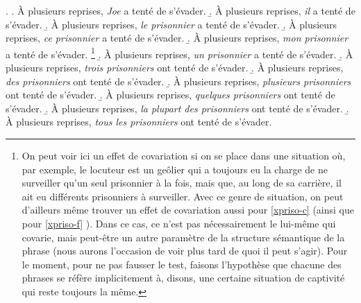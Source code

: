 \ex. \label{xGNsubitcv}
\a. À plusieurs reprises, \emph{Joe} a tenté de s'évader. 
\b. À plusieurs reprises, \emph{il} a tenté de s'évader.\label{xpriso-b}  
\b. À plusieurs reprises, \emph{le prisonnier} a tenté de s'évader.\label{xpriso-c} 
\b. À plusieurs reprises, \emph{ce prisonnier} a tenté de s'évader. 
\b. À plusieurs reprises, \emph{mon prisonnier} a tenté de s'évader.%
\footnote{\label{fnmonpriso}On peut voir ici un effet de covariation si on se place dans une situation où, par exemple, le locuteur est un geôlier qui a toujours eu la charge de ne surveiller qu'un seul prisonnier à la fois, mais que, au long de sa carrière, il ait eu différents prisonniers à surveiller. Avec ce genre de situation, on peut d'ailleurs même trouver un effet de covariation aussi pour \ref{xpriso-c} (ainsi que pour \ref{xpriso-f} ). Dans ce cas, ce n'est pas nécessairement le {\GN} lui-même qui covarie, mais peut-être un autre paramètre de la structure sémantique de la phrase (nous aurons l'occasion de voir plus tard de quoi il peut s'agir). %
Pour le moment, pour ne pas fausser le test, faisons l'hypothèse que chacune des phrases se réfère implicitement à, disons, une certaine situation de captivité qui reste toujours la même.} 
\b. \jcovar À plusieurs reprises, \emph{un prisonnier} a tenté de s'évader. 
\b. \jcovar À plusieurs reprises, \emph{trois prisonniers} ont tenté de s'évader. 
\b. \jcovar À plusieurs reprises, \emph{des prisonniers} ont tenté de s'évader. 
\b. \jcovar À plusieurs reprises, \emph{plusieurs prisonniers} ont tenté de s'évader. 
\b. \jcovar À plusieurs reprises, \emph{quelques prisonniers} ont tenté de s'évader. 
\b. \jcovar À plusieurs reprises, \emph{la plupart des prisonniers} ont tenté de s'évader.\label{xpriso-l}   
\b. À plusieurs reprises, \emph{tous les prisonniers} ont tenté de s'évader.\label{xpriso-m}


